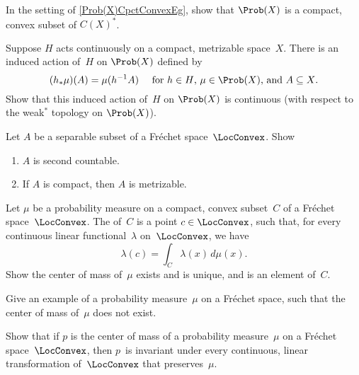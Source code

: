 \begin{exercises}

\item[]

\item \label{Prob(X)cpctEx}
In the setting of \cref{Prob(X)CpctConvexEg}, show that $\Prob(X)$ is a compact, convex subset of $C(X)^*$.

\item \label{HonProb(X)cont}
Suppose $H$ acts continuously on a compact, metrizable space~$X$. There is an induced action of~$H$ on $\Prob(X)$ defined by
	$$ \text{$(h_*\mu)(A) = \mu (h^{-1} A)$ \quad for $h \in H$, $\mu \in \Prob(X)$, and $A \subseteq X$} .$$
Show that this induced action of~$H$ on $\Prob(X)$ is continuous (with respect to the weak$^*$ topology on $\Prob(X)$).

\item \label{CpctFrechet->Metrizable}
Let $A$ be a separable subset of a Fréchet space~$\LocConvex$. Show
	\begin{enumerate}
	\item $A$ is second countable.
	\item \label{CpctFrechet->Metrizable-metrizable}
 If $A$ is compact, then $A$ is metrizable.
	\end{enumerate}

\item \label{CenterInC}
Let $\mu$ be a probability measure on a compact, convex subset~$C$ of a Fréchet space~$\LocConvex$. The  of~$C$ is a point $c \in \LocConvex$, such that, for every continuous linear functional~$\lambda$ on~$\LocConvex$, we have
	$$ \lambda (c) = \int_C \lambda(x) \, d\mu(x) .$$
Show the center of mass of~$\mu$ exists and is unique, and is an element of~$C$.

\item
Give an example of a probability measure~$\mu$ on a Fréchet space, such that the center of mass of~$\mu$ does not exist.

\item \label{CenterInvt}
Show that if $p$ is the center of mass of a probability measure~$\mu$ on a Fréchet space~$\LocConvex$, then $p$~is invariant under every continuous, linear transformation of~$\LocConvex$ that preserves~$\mu$.


\end{exercises}
